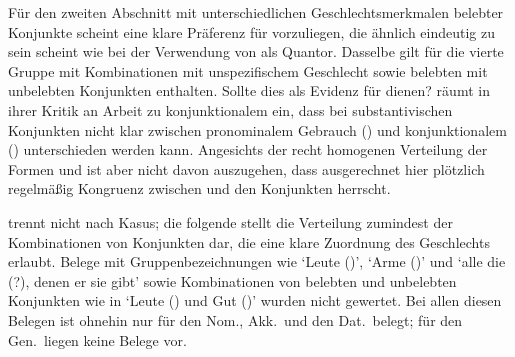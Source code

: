 Für den zweiten Abschnitt mit unterschiedlichen
Geschlechtsmerkmalen belebter Konjunkte scheint
eine klare Präferenz für  vorzuliegen, die ähnlich eindeutig zu
sein scheint wie bei der Verwendung von  als Quantor. Dasselbe gilt
für die vierte Gruppe mit Kombinationen mit unspezifischem Geschlecht sowie
belebten mit unbelebten Konjunkten enthalten. Sollte dies als
Evidenz für  dienen? \citet[187]{gjelsten1980} räumt in
ihrer Kritik an  Arbeit zu konjunktionalem
 ein, dass bei substantivischen Konjunkten nicht
klar zwischen pronominalem Gebrauch () und
konjunktionalem () unterschieden werden
kann. Angesichts der recht homogenen Verteilung der Formen  und
 ist aber nicht davon auszugehen, dass ausgerechnet hier plötzlich
regelmäßig Kongruenz zwischen  und den Konjunkten herrscht.

 trennt nicht nach Kasus; die folgende
 stellt die Verteilung zumindest der
Kombinationen von Konjunkten dar, die eine klare Zuordnung des Geschlechts
erlaubt. Belege mit Gruppenbezeichnungen wie  `Leute (\MascA)',
 `Arme (\MascA)' und  `alle die
(\MascA?), denen er sie gibt' sowie Kombinationen von belebten und
unbelebten Konjunkten wie in  `Leute
(\MascA) und Gut (\NeutI)' wurden nicht gewertet. Bei allen diesen Belegen ist
ohnehin nur  für den Nom., Akk.\ und den Dat.\ belegt; für den
Gen.\ liegen keine Belege vor.

